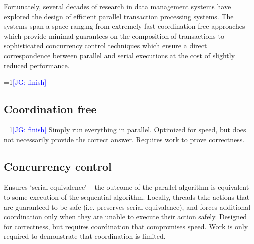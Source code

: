 \documentclass{article} %
\newcommand{\Comments}{1}
\newcommand{\note}[2]{\ifnum\Comments=1\textcolor{#1}{#2}\fi}
\newcommand{\joey}[1]{\note{blue}{[JG: #1]}}
\begin{document}
Fortunately, several decades of research in data management systems have explored the design of efficient parallel transaction processing systems.
The systems span a space ranging from extremely fast coordination free approaches which provide minimal guarantees on the composition of transactions to sophisticated concurrency control techniques which ensure a direct correspondence between parallel and serial executions at the cost of slightly reduced performance.


\joey{finish}
\subsection{Coordination free}
\joey{finish}
Simply run everything in parallel.
Optimized for speed, but does not necessarily provide the correct answer.
Requires work to prove correctness.

\subsection{Concurrency control}
Ensures `serial equivalence' -- the outcome of the parallel algorithm is equivalent to some execution of the sequential algorithm.
Locally, threads take actions that are guaranteed to be safe (i.e. preserves serial equivalence), and forces additional coordination only when they are unable to execute their action safely.
Designed for correctness, but requires coordination that compromises speed.
Work is only required to demonstrate that coordination is limited.
\end{document}

